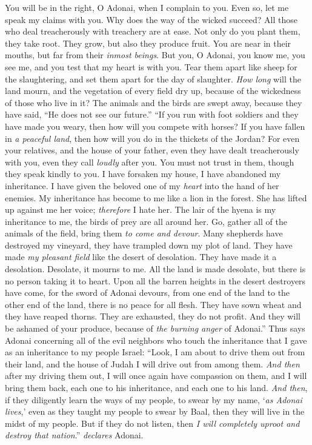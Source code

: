 \begin{biblechapter} %
 You will be in the right, O Adonai, when I complain to you. 
Even so, let me speak my claims with you. 
Why does the way of the wicked succeed? 
All those who deal treacherously with treachery are at ease.
\verse Not only do you plant them, they take root. 
They grow, but also they produce fruit. 
You are near in their mouths, 
but far from their \textit{inmost beings}.
\verse But you, O Adonai, you know me, 
you see me, and you test that my heart is with you. 
Tear them apart like sheep for the slaughtering, 
and set them apart for the day of slaughter.
\verse \textit{How long} will the land mourn, and the vegetation of every field dry up, 
because of the wickedness of those who live in it? 
The animals and the birds are swept away, 
because they have said, “He does not see our future.”
 “If you run with foot soldiers and they have made you weary, 
then how will you compete with horses? 
If you have fallen in \textit{a peaceful land}, 
then how will you do in the thickets of the Jordan?
\verse For even your relatives, and the house of your father, 
even they have dealt treacherously with you, 
even they call \textit{loudly} after you. 
You must not trust in them, though they speak kindly to you.
\verse I have forsaken my house, I have abandoned my inheritance. 
I have given the beloved one of my \textit{heart} into the hand of her enemies.
\verse My inheritance has become to me like a lion in the forest. 
She has lifted up against me her voice; \textit{therefore} I hate her.
\verse The lair of the hyena is my inheritance to me, 
the birds of prey are all around her. 
Go, gather all of the animals of the field, 
bring them \textit{to come and devour}.
\verse Many shepherds have destroyed my vineyard, 
they have trampled down my plot of land. 
They have made \textit{my pleasant field} 
like the desert of desolation.
\verse They have made it a desolation. 
Desolate, it mourns to me. 
All the land is made desolate, 
but there is no person taking it to heart.
\verse Upon all the barren heights in the desert destroyers have come, 
for the sword of Adonai devours, 
from one end of the land to the other end of the land, 
there is no peace for all flesh.
\verse They have sown wheat and they have reaped thorns. 
They are exhausted, they do not profit. 
And they will be ashamed of your produce, 
because of \textit{the burning anger} of Adonai.”
\verse Thus says Adonai concerning all of the evil neighbors who touch the inheritance that I gave as an inheritance to my people Israel: “Look, I am about to drive them out from their land, and the house of Judah I will drive out from among them.
\verse \textit{And then} after my driving them out, I will once again have compassion on them, and I will bring them back, each one to his inheritance, and each one to his land.
\verse \textit{And then}, if they diligently learn the ways of my people, to swear by my name, ‘\textit{as Adonai lives},’ even as they taught my people to swear by Baal, then they will live in the midst of my people.
\verse But if they do not listen, then \textit{I will completely uproot and destroy that nation}.” \textit{declares} Adonai.
\end{biblechapter}

